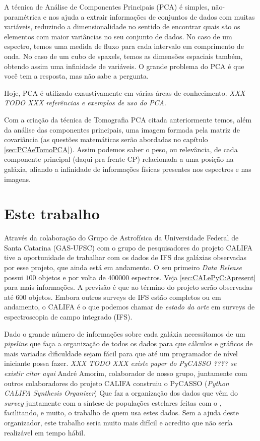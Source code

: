 A técnica de Análise de Componentes Principais (PCA) é simples, não-paramétrica
e nos ajuda a extrair informações de conjuntos de dados com muitas variáveis,
reduzindo a dimensionalidade no sentido de encontrar quais são os elementos com
maior variâncias no seu conjunto de dados. No caso de um espectro, temos uma
medida de fluxo para cada intervalo em comprimento de onda. No caso de um cubo
de spaxels, temos as dimensões espaciais também, obtendo assim uma infinidade de
variáveis. O grande problema do PCA é que você tem a resposta, mas não sabe a
pergunta.

Hoje, PCA é utilizado exaustivamente em várias áreas de conhecimento. {\em XXX
TODO XXX referências e exemplos de uso do PCA}.

Com a criação da técnica de Tomografia PCA citada anteriormente temos, além da
análise das componentes principais, uma imagem formada pela matriz de
covariância (as questões matemáticas serão abordadas no
capítulo \ref{sec:PCAeTomoPCA}). Assim podemos saber o peso, ou relevância, de
cada componente principal (daqui pra frente CP) relacionada a uma posição na
galáxia, aliando a infinidade de informações físicas presentes nos espectros e
nas imagens.

\section{Este trabalho}
\label{sec:Intro:ThisWork}

Através da colaboração do Grupo de Astrofísica da Universidade Federal de Santa
Catarina (GAS-UFSC) com o grupo de pesquisadores do projeto CALIFA tive a
oportunidade de trabalhar com os dados de IFS das galáxias observadas por esse
projeto, que ainda está em andamento. O seu primeiro {\em Data Release}
\citep{CALIFADR1} possui $100$ objetos e por volta de $400000$ espectros.
Veja \ref{sec:CALePyC:Apresent} para mais informações. A previsão é que ao
término do projeto serão observadas até $600$ objetos. Embora outros surveys de
IFS estão completos ou em andamento, o CALIFA é o que podemos chamar de {\em
estado da arte} em surveys de espectroscopia de campo integrado (IFS).

Dado o grande número de informações sobre cada galáxia necessitamos de um {\em
pipeline} que faça a organização de todos os dados para que cálculos e gráficos
de mais variadas dificuldade sejam fácil para que até um programador de nível
iniciante possa fazer. {\em XXX TODO XXX existe paper do PyCASSO ???? se existir
citar aqui} André Amorim, colaborador de nosso grupo, juntamente com outros
colaboradores do projeto CALIFA construiu o PyCASSO ({\em Python CALIFA
\starlight Synthesis Organizer}) Que faz a organização dos dados que vêm do
{\em survey} juntamente com a síntese de populações estelares feitas com
o \starlight, facilitando, e muito, o trabalho de quem usa estes dados. Sem a
ajuda deste organizador, este trabalho seria muito mais difícil e acredito que
não sería realizável em tempo hábil.


